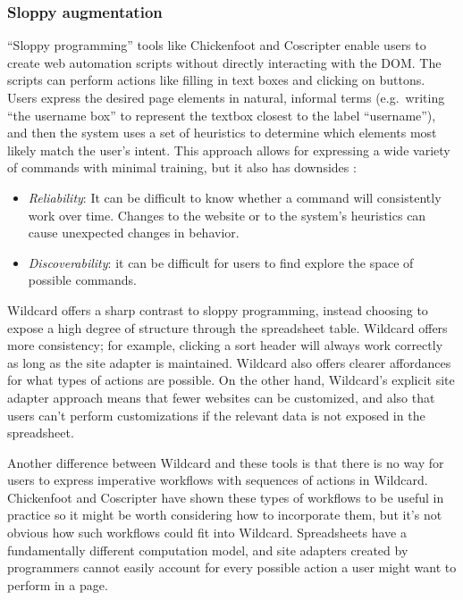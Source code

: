 \documentclass[english,submission]{programming}
\providecommand{\tightlist}{%
  \setlength{\itemsep}{0pt}\setlength{\parskip}{0pt}}
\begin{document}
\hypertarget{sloppy-augmentation}{%
\subsubsection{Sloppy augmentation}\label{sloppy-augmentation}}

``Sloppy programming'' \autocite{little2010} tools like Chickenfoot
\autocite{bolin2005} and Coscripter \autocite{leshed2008} enable users
to create web automation scripts without directly interacting with the
DOM. The scripts can perform actions like filling in text boxes and
clicking on buttons. Users express the desired page elements in natural,
informal terms (e.g.~writing ``the username box'' to represent the
textbox closest to the label ``username''), and then the system uses a
set of heuristics to determine which elements most likely match the
user's intent. This approach allows for expressing a wide variety of
commands with minimal training, but it also has downsides
\autocite{little2010}:

\begin{itemize}
\tightlist
\item
  \emph{Reliability}: It can be difficult to know whether a command will
  consistently work over time. Changes to the website or to the system's
  heuristics can cause unexpected changes in behavior.
\item
  \emph{Discoverability}: it can be difficult for users to find explore
  the space of possible commands.
\end{itemize}

Wildcard offers a sharp contrast to sloppy programming, instead choosing
to expose a high degree of structure through the spreadsheet table.
Wildcard offers more consistency; for example, clicking a sort header
will always work correctly as long as the site adapter is maintained.
Wildcard also offers clearer affordances for what types of actions are
possible. On the other hand, Wildcard's explicit site adapter approach
means that fewer websites can be customized, and also that users can't
perform customizations if the relevant data is not exposed in the
spreadsheet.

Another difference between Wildcard and these tools is that there is no
way for users to express imperative workflows with sequences of actions
in Wildcard. Chickenfoot and Coscripter have shown these types of
workflows to be useful in practice so it might be worth considering how
to incorporate them, but it's not obvious how such workflows could fit
into Wildcard. Spreadsheets have a fundamentally different computation
model, and site adapters created by programmers cannot easily account
for every possible action a user might want to perform in a page.
\end{document}

